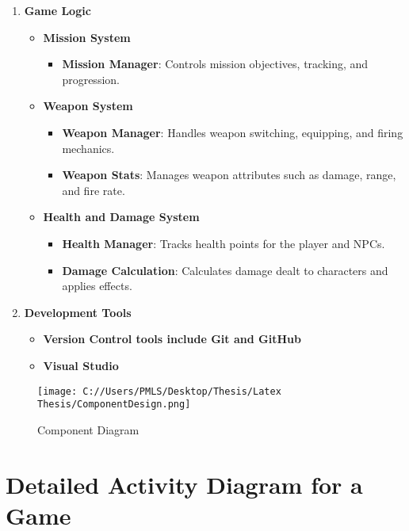 \begin{enumerate}
	\item \textbf{Game Logic}
	\begin{itemize}
		\item \textbf{Mission System}
		\begin{itemize}
			\item \textbf{Mission Manager}: Controls mission objectives, tracking, and progression.
		\end{itemize}
		\item \textbf{Weapon System}
		\begin{itemize}
			\item \textbf{Weapon Manager}: Handles weapon switching, equipping, and firing mechanics.
			\item \textbf{Weapon Stats}: Manages weapon attributes such as damage, range, and fire rate.
		\end{itemize}
		\item \textbf{Health and Damage System}
		\begin{itemize}
			\item \textbf{Health Manager}: Tracks health points for the player and NPCs.
			\item \textbf{Damage Calculation}: Calculates damage dealt to characters and applies effects.
		\end{itemize}
	\end{itemize}
	\item \textbf{Development Tools}
	\begin{itemize}
		\item \textbf{Version Control tools include Git and GitHub}
		\item \textbf{Visual Studio}
	\end{itemize}
\end{enumerate}

\begin{figure}[H]
	\centering
	\texttt{[image: C://Users/PMLS/Desktop/Thesis/Latex Thesis/ComponentDesign.png]}
	\caption{Component Diagram}
	\label{fig:Component Diagram}
\end{figure}


\section{Detailed Activity Diagram for a Game}

